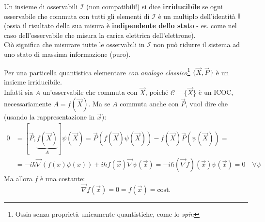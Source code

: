 \documentclass[../../FisicaTeorica.tex]{subfiles}
\begin{document}
\begin{dfn}
Un insieme di osservabili $\mathcal{I}$ (non compatibili!) si dice \textbf{irriducibile} se ogni osservabile che commuta con tutti gli elementi di $\mathcal{I}$ è un multiplo dell'identità $\mathbb{I}$ (ossia il risultato della sua misura è  \textbf{indipendente dello stato} - es. come nel caso dell'osservabile che misura la carica elettrica dell'elettrone).\\
Ciò significa che misurare tutte le osservabili in $\mathcal{I}$ non può ridurre il sistema ad uno stato di massima informazione (puro).%
\end{dfn}
\begin{oss}
Per una particella quantistica elementare \textit{con analogo classico}\footnote{Ossia senza proprietà unicamente quantistiche, come lo \textit{spin}} $\{\vec{X},\vec{P}\,\}$ è un insieme irriducibile.\\ %
Infatti sia $A$ un'osservabile che commuta con $\vec{X}$, poiché $\mathcal{C}=\{\vec{X}\}$ è un ICOC, necessariamente $A=f(\vec{X})$. Ma se $A$ commuta anche con $\vec{P}$, vuol dire che (usando la rappresentazione in $\vec{x}$):
\begin{align*}
0&=[\vec{P}, \underbrace{f(\vec{X})}_{A}]\psi(\vec{X})=
\vec{P}(f(\vec{X})\psi(\vec{X}))-f(\vec{X})\vec{P}(\psi(\vec{X}))=\\
&=-i\hbar \vec{\nabla}(f(x)\psi(x))+i\hbar f(\vec{x})\vec{\nabla}\psi(\vec{x}) = -i\hbar(\vec{\nabla}f)(\vec{x})\psi(\vec{x})=0 \quad \forall \psi
\end{align*}
Ma allora $f$ è una costante:
\[
\vec{\nabla}f(\vec{x})=0=f(\vec{x})=\text{cost.}
\]
\end{oss}
\end{document}
